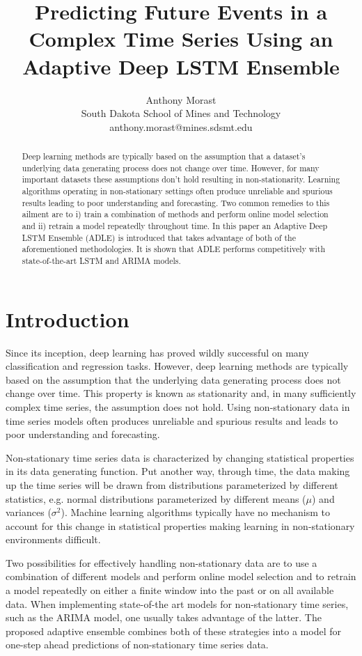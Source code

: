\documentclass{article}
\title{Predicting Future Events in a Complex Time Series Using an Adaptive Deep LSTM Ensemble}
\author{Anthony Morast\\
		South Dakota School of Mines and Technology\\
        anthony.morast@mines.sdsmt.edu}
\begin{document}
\maketitle

\begin{abstract}
  Deep learning methods are typically based on the assumption that a dataset's underlying data generating process does not change over time. However, for many important datasets these assumptions don't hold resulting in non-stationarity. Learning algorithms operating in non-stationary settings often produce unreliable and spurious results leading to poor understanding and forecasting. Two common remedies to this ailment are to i) train a combination of methods and perform online model selection and ii) retrain a model repeatedly throughout time. In this paper an Adaptive Deep LSTM Ensemble (ADLE) is introduced that takes advantage of both of the aforementioned methodologies. It is shown that ADLE performs competitively with state-of-the-art LSTM and ARIMA models. 
\end{abstract}

\section{Introduction}

Since its inception, deep learning has proved wildly successful on many classification and regression tasks. However, deep learning methods are typically based on the assumption that the underlying data generating process does not change over time. This property is known as stationarity and, in many sufficiently complex time series, the assumption does not hold. Using non-stationary data in time series models often produces unreliable and spurious results and leads to poor understanding and forecasting.

Non-stationary time series data is characterized by changing statistical properties in its data generating function. Put another way, through time, the data making up the time series will be drawn from distributions parameterized by different statistics, e.g. normal distributions parameterized by different means ($\mu$) and variances ($\sigma^2$). Machine learning algorithms typically have no mechanism to account for this change in statistical properties making learning in non-stationary environments difficult.

Two possibilities for effectively handling non-stationary data are to use a combination of different models and perform online model selection and to retrain a model repeatedly on either a finite window into the past or on all available data. When implementing state-of-the art models for non-stationary time series, such as the ARIMA model, one usually takes advantage of the latter. The proposed adaptive ensemble combines both of these strategies into a model for one-step ahead predictions of non-stationary time series data.
\end{document}
